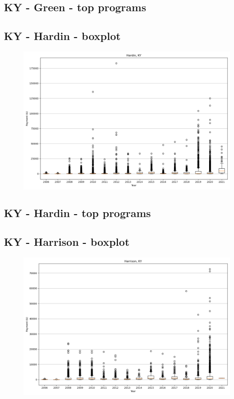 \subsection*{KY - Green - top programs}

\newpage
\subsection*{KY - Hardin - boxplot}
\begin{figure}[h]
\centering
\includegraphics[width=7in]{../output/boxplots/counties/Hardin-KY_boxplot.png}
\end{figure}


\subsection*{KY - Hardin - top programs}

\newpage
\subsection*{KY - Harrison - boxplot}
\begin{figure}[h]
\centering
\includegraphics[width=7in]{../output/boxplots/counties/Harrison-KY_boxplot.png}
\end{figure}


